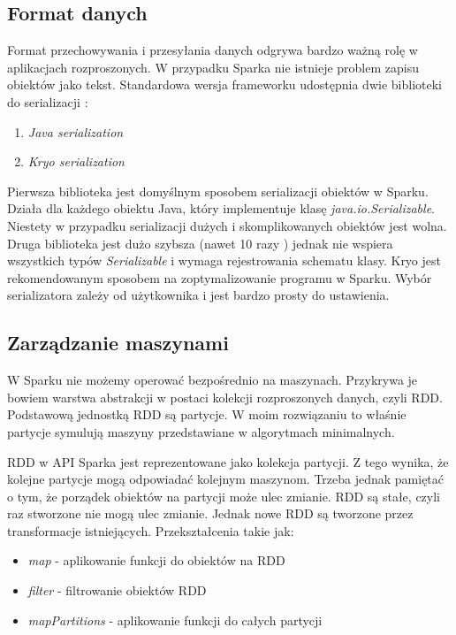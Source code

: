 \documentclass[licencjacka]{pracamgr}
\begin{document}
\subsection{Format danych}
Format przechowywania i przesyłania danych odgrywa bardzo ważną rolę w aplikacjach rozproszonych. W przypadku Sparka nie istnieje problem zapisu obiektów jako tekst. Standardowa wersja frameworku udostępnia dwie biblioteki do serializacji \cite{karau2015learning}:
\begin{enumerate}
    \item \textit{Java serialization}
    \item \textit{Kryo serialization}
\end{enumerate}

Pierwsza biblioteka jest domyślnym sposobem serializacji obiektów w Sparku. Działa dla każdego obiektu Java, który implementuje klasę \textit{java.io.Serializable}. Niestety w przypadku serializacji dużych i skomplikowanych obiektów jest wolna. Druga biblioteka jest dużo szybsza (nawet 10 razy \cite{spark_serialization}) jednak nie wspiera wszystkich typów \textit{Serializable} i wymaga rejestrowania schematu klasy. Kryo jest rekomendowanym sposobem na zoptymalizowanie programu w Sparku. Wybór serializatora zależy od użytkownika i jest bardzo prosty do ustawienia.

\subsection{Zarządzanie maszynami}

W Sparku nie możemy operować bezpośrednio na maszynach. Przykrywa je bowiem warstwa abstrakcji w postaci kolekcji rozproszonych danych, czyli RDD. Podstawową jednostką RDD są partycje. W moim rozwiązaniu to właśnie partycje symulują maszyny przedstawiane w algorytmach minimalnych.

RDD w API Sparka jest reprezentowane jako kolekcja partycji. Z tego wynika, że kolejne partycje mogą odpowiadać kolejnym maszynom. Trzeba jednak pamiętać o tym, że porządek obiektów na partycji może ulec zmianie. RDD są stałe, czyli raz stworzone nie mogą ulec zmianie. Jednak nowe RDD są tworzone przez transformacje istniejących. Przekształcenia takie jak:
\begin{itemize}
    \item \textit{map} - aplikowanie funkcji do obiektów na RDD
    \item \textit{filter} - filtrowanie obiektów RDD
    \item \textit{mapPartitions} - aplikowanie funkcji do całych partycji
\end{itemize}
 
\end{document}
